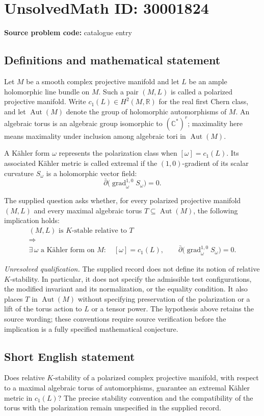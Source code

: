 \documentclass[11pt]{article}
\newcommand{\R}{\mathbb{R}}
\newcommand{\C}{\mathbb{C}}
\begin{document}
\section*{UnsolvedMath ID: 30001824}
\textbf{Source problem code:} catalogue entry
\subsection{Definitions and mathematical statement}
Let \(M\) be a smooth complex projective manifold and let \(L\) be an ample holomorphic line bundle on \(M\). Such a pair \((M,L)\) is called a polarized projective manifold. Write \(c_1(L)\in H^2(M,\R)\) for the real first Chern class, and let \(\operatorname{Aut}(M)\) denote the group of holomorphic automorphisms of \(M\). An algebraic torus is an algebraic group isomorphic to \((\C^*)^r\); maximality here means maximality under inclusion among algebraic tori in \(\operatorname{Aut}(M)\).

A Kähler form \(\omega\) represents the polarization class when \([\omega]=c_1(L)\). Its associated Kähler metric is called extremal if the \((1,0)\)-gradient of its scalar curvature \(S_\omega\) is a holomorphic vector field:
\[
\bar\partial\bigl(\operatorname{grad}^{1,0}_{\omega}S_\omega\bigr)=0.
\]

The supplied question asks whether, for every polarized projective manifold \((M,L)\) and every maximal algebraic torus \(T\subseteq\operatorname{Aut}(M)\), the following implication holds:
\[
\begin{gathered}
(M,L)\text{ is \(K\)-stable relative to }T
\\[2pt]
\Longrightarrow
\\[2pt]
\exists\,\omega\text{ a Kähler form on }M:\quad
[\omega]=c_1(L),\qquad
\bar\partial\bigl(\operatorname{grad}^{1,0}_{\omega}S_\omega\bigr)=0.
\end{gathered}
\]

\emph{Unresolved qualification.} The supplied record does not define its notion of relative \(K\)-stability. In particular, it does not specify the admissible test configurations, the modified invariant and its normalization, or the equality condition. It also places \(T\) in \(\operatorname{Aut}(M)\) without specifying preservation of the polarization or a lift of the torus action to \(L\) or a tensor power. The hypothesis above retains the source wording; these conventions require source verification before the implication is a fully specified mathematical conjecture.
\subsection{Short English statement}
Does relative \(K\)-stability of a polarized complex projective manifold, with respect to a maximal algebraic torus of automorphisms, guarantee an extremal Kähler metric in \(c_1(L)\)? The precise stability convention and the compatibility of the torus with the polarization remain unspecified in the supplied record.
\end{document}
